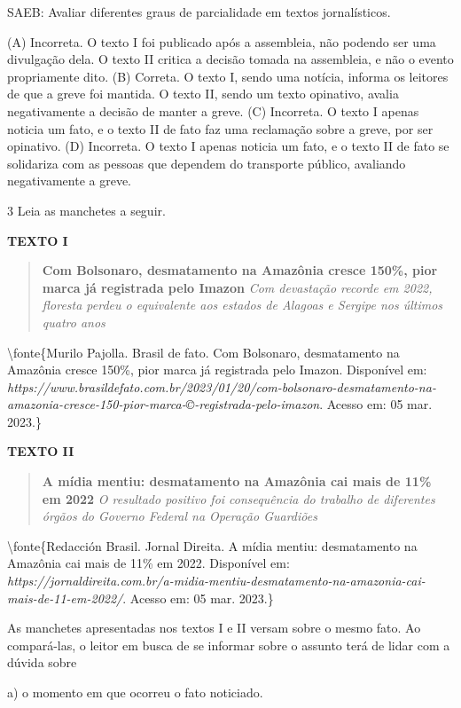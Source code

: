 SAEB: Avaliar diferentes graus de parcialidade em textos jornalísticos.

(A) Incorreta. O texto I foi publicado após a assembleia, não podendo
ser uma divulgação dela. O texto II critica a decisão tomada na
assembleia, e não o evento propriamente dito. (B) Correta. O texto I,
sendo uma notícia, informa os leitores de que a greve foi mantida. O
texto II, sendo um texto opinativo, avalia negativamente a decisão de
manter a greve. (C) Incorreta. O texto I apenas noticia um fato, e o
texto II de fato faz uma reclamação sobre a greve, por ser opinativo.
(D) Incorreta. O texto I apenas noticia um fato, e o texto II de fato se
solidariza com as pessoas que dependem do transporte público, avaliando
negativamente a greve.

\num{3} Leia as manchetes a seguir.

\textbf{TEXTO I}

\begin{quote}
\textbf{Com Bolsonaro, desmatamento na Amazônia cresce 150\%, pior marca
já registrada pelo Imazon} \emph{Com devastação recorde em 2022,
floresta perdeu o equivalente aos estados de Alagoas e Sergipe nos
últimos quatro anos}
\end{quote}

\textbackslash fonte\{Murilo Pajolla. Brasil de fato. Com Bolsonaro,
desmatamento na Amazônia cresce 150\%, pior marca já registrada pelo
Imazon. Disponível em:
\emph{https://www.brasildefato.com.br/2023/01/20/com-bolsonaro-desmatamento-na-amazonia-cresce-150-pior-marca-©-registrada-pelo-imazon}.
Acesso em: 05 mar. 2023.\}

\textbf{TEXTO II}

\begin{quote}
\textbf{A mídia mentiu: desmatamento na Amazônia cai mais de 11\% em
2022} \emph{O resultado positivo foi consequência do trabalho de
diferentes órgãos do Governo Federal na Operação Guardiões}
\end{quote}

\textbackslash fonte\{Redacción Brasil. Jornal Direita. A mídia mentiu:
desmatamento na Amazônia cai mais de 11\% em 2022. Disponível em:
\emph{https://jornaldireita.com.br/a-midia-mentiu-desmatamento-na-amazonia-cai-mais-de-11-em-2022/}.
Acesso em: 05 mar. 2023.\}

As manchetes apresentadas nos textos I e II versam sobre o mesmo fato.
Ao compará-las, o leitor em busca de se informar sobre o assunto terá de
lidar com a dúvida sobre

a) o momento em que ocorreu o fato noticiado.

